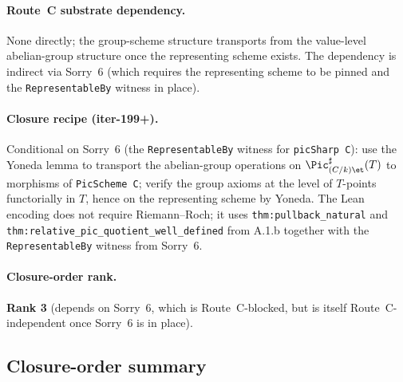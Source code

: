 \paragraph{Route~C substrate dependency.} None directly; the
group-scheme structure transports from the value-level abelian-group
structure once the representing scheme exists. The dependency is
indirect via Sorry~6 (which requires the representing scheme to be
pinned and the \texttt{RepresentableBy} witness in place).

\paragraph{Closure recipe (iter-199+).} Conditional on Sorry~6
(the \texttt{RepresentableBy} witness for \texttt{picSharp C}): use
the Yoneda lemma to transport the abelian-group operations on
$\Pic^\sharp_{(C/k)\et}(T)$ to morphisms of \texttt{PicScheme C};
verify the group axioms at the level of $T$-points functorially in
$T$, hence on the representing scheme by Yoneda. The Lean
encoding does not require Riemann--Roch; it uses
\texttt{thm:pullback\_natural} and
\texttt{thm:relative\_pic\_quotient\_well\_defined} from A.1.b together
with the \texttt{RepresentableBy} witness from Sorry~6.

\paragraph{Closure-order rank.} \textbf{Rank 3} (depends on Sorry~6,
which is Route~C-blocked, but is itself Route~C-independent
once Sorry~6 is in place).

\subsection{Closure-order summary}
\label{subsec:fga_pic_closure_order_summary}

